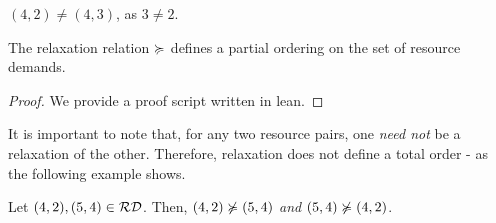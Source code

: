 \begin{example}
   \((4, 2) \neq (4, 3)\), as \(3 \neq 2\).
\end{example}

\begin{lemma}
   The relaxation relation \(\succcurlyeq\) defines a partial ordering on the set of resource demands.
\end{lemma}

\begin{proof}
   We provide a proof script written in lean.
\end{proof}

It is important to note that, for any two resource pairs, one \emph{need not} be a relaxation of the other. Therefore, relaxation does not define a total order - as the following example shows.

\begin{example}
   Let \((4,2), (5,4) \in \mathcal{RD}\). Then, \((4,2) \notrelaxation (5,4)\) \emph{and} \((5,4) \notrelaxation (4,2)\).
\end{example}



